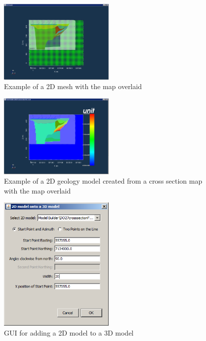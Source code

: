 \begin{figure} [h]
    \centering
    \includegraphics[width=0.5\textwidth]{images/MaptoModel/mapMeshCross.PNG}
    \caption{Example of a 2D mesh with the map overlaid}
    \label{fig:mapMeshCross}
\end{figure}
\begin{figure} [h]
    \centering
    \includegraphics[width=0.5\textwidth]{images/MaptoModel/mapModelCross.PNG}
    \caption{Example of a 2D geology model created from a cross section map with the map overlaid}
    \label{fig:mapModelCross}
\end{figure}
\begin{figure} [h]
    \centering
    \includegraphics[width=0.5\textwidth]{images/MaptoModel/add2Dto3D.PNG}
    \caption{GUI for adding a 2D model to a 3D model}
    \label{fig:add2Dto3D}
\end{figure}
